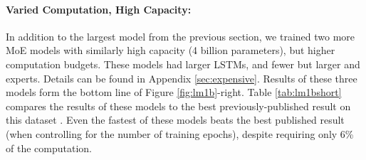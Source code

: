 \documentclass{article}
\begin{document}
\begin{table}[!htbp]
\caption{ Summary of high-capacity MoE-augmented models with varying computational budgets, vs. best previously published results \citep{RafalNoam16}.  Details in Appendix \ref{sec:appendixlm1b}.}
\label{tab:lm1bshort}
\begin{center}
\setlength\tabcolsep{3pt}
\end{center}
\end{table}

\paragraph{Varied Computation, High Capacity:}  In addition to the largest model from the previous section, we trained two more MoE models with similarly high capacity (4 billion parameters), but higher computation budgets.  These models had larger LSTMs, and fewer but larger and experts.  Details can be found in Appendix \ref{sec:expensive}.  Results of these three models form the bottom line of Figure \ref{fig:lm1b}-right.  Table \ref{tab:lm1bshort} compares the results of these models to the best previously-published result on this dataset .  Even the fastest of these models beats the best published result (when controlling for the number of training epochs), despite requiring only 6\% of the computation.  
\end{document}
